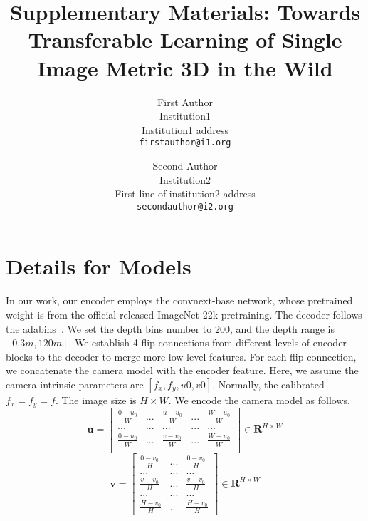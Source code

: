 \documentclass[10pt,onecolumn,letterpaper]{article}
\begin{document}
\title{Supplementary Materials: Towards Transferable Learning of Single Image Metric 3D in the Wild
} 


\author{First Author\\
Institution1\\
Institution1 address\\
{\tt\small firstauthor@i1.org}
\and
Second Author\\
Institution2\\
First line of institution2 address\\
{\tt\small secondauthor@i2.org}
}

\maketitle

\section{Details for Models}
In our work, our encoder employs the convnext-base network, whose pretrained weight is from the official released ImageNet-22k pretraining. The decoder follows the adabins~\cite{bhat2021adabins}. We set the depth bins number to 200, and the depth range is $[0.3m, 120m]$. We establish 4 flip connections from different levels of encoder blocks to the decoder to merge more low-level features. For each flip connection, we concatenate the camera model with the encoder feature. Here, we assume the camera intrinsic parameters are $[f_x, f_y, u0, v0]$. Normally, the calibrated $f_x = f_y = f$. The image size is $H \times W$. We encode the camera model as follows. 
\begin{equation}
\mathbf{u}=\begin{bmatrix}
\frac{0-u_0}{W} &... &\frac{u-u_0}{W} & ... &\frac{W-u_0}{W} \\ 
... &...  &...&...  &... \\ 
\frac{0-u_0}{W} &...  &\frac{v-v_0}{W} & ... &\frac{W-u_0}{W}  \\ 
\end{bmatrix} \in \mathbf{R}^{H \times W}
\end{equation}
\begin{equation}
    \mathbf{v}=\begin{bmatrix}
\frac{0-v_0}{H} &...  &\frac{0-v_0}{H} \\ 
... &...  &... \\ 
\frac{v-v_0}{H} &...  &\frac{v-v_0}{H} \\ 
... &...  &... \\ 
\frac{H-v_0}{H} &...  &\frac{H-v_0}{H} 
\end{bmatrix} \in \mathbf{R}^{H \times W}
\end{equation}
\end{document}
